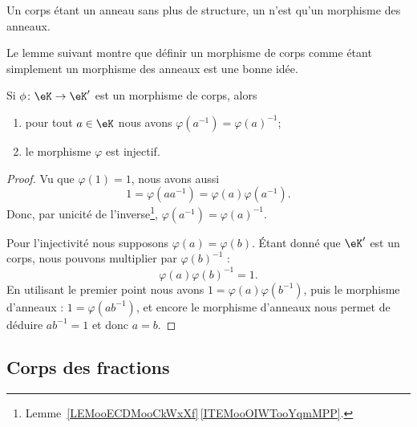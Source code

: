 \begin{definition}
    Un corps étant un anneau sans plus de structure, un  n'est qu'un morphisme des anneaux.
\end{definition}

Le lemme suivant montre que définir un morphisme de corps comme étant simplement un morphisme des anneaux est une bonne idée.
\begin{lemma}       \label{LEMooWBOPooZnsZgQ}
    Si \( \phi\colon \eK\to \eK'\) est un morphisme de corps, alors
    \begin{enumerate}
        \item
            pour tout \( a\in \eK\) nous avons \( \varphi(a^{-1})=\varphi(a)^{-1}\);
        \item
            le morphisme \( \varphi\) est injectif.
    \end{enumerate}
\end{lemma}

\begin{proof}
    Vu que \( \varphi(1)=1\), nous avons aussi
    \begin{equation}
        1=\varphi(aa^{-1})=\varphi(a)\varphi(a^{-1}).
    \end{equation}
    Donc, par unicité de l'inverse\footnote{Lemme~\ref{LEMooECDMooCkWxXf}\,\ref{ITEMooOIWTooYqmMPP}.}, \( \varphi(a^{-1})=\varphi(a)^{-1}\).

    Pour l'injectivité nous supposons \( \varphi(a)=\varphi(b)\). Étant donné que \( \eK'\) est un corps, nous pouvons multiplier par \( \varphi(b)^{-1}\) :
    \begin{equation}
        \varphi(a)\varphi(b)^{-1}=1.
    \end{equation}
    En utilisant le premier point nous avons \( 1=\varphi(a)\varphi(b^{-1})\), puis le morphisme d'anneaux : \( 1=\varphi(ab^{-1})\), et encore le morphisme d'anneaux nous permet de déduire \( ab^{-1}=1\) et donc \(a=b\).
\end{proof}

\subsection{Corps des fractions}

